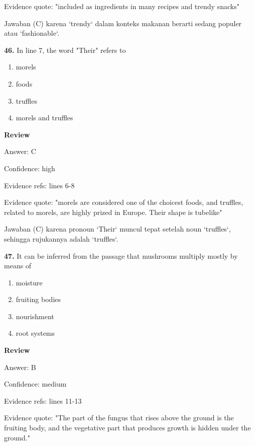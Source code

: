 \documentclass[12pt]{article}
\begin{document}
Evidence quote: "included as ingredients in many recipes and trendy snacks"\par
Jawaban (C) karena `trendy` dalam konteks makanan berarti sedang populer atau `fashionable`.\par
\endgroup
\par
\vspace{0.25\baselineskip}
\noindent\textbf{46.} In line 7, the word "Their" refers to
\begin{enumerate}[label=(\Alph*),leftmargin=*,itemsep=0.2em]
\item morels
\item foods
\item truffles
\item morels and truffles
\end{enumerate}
\par
\begingroup
\setlength{\parskip}{0pt}
\setlength{\parindent}{0pt}
\textbf{Review}\par
Answer: C\par
Confidence: high\par
Evidence refs: lines 6-8\par
Evidence quote: "morels are considered one of the choicest foods, and truffles, related to morels, are highly prized in Europe. Their shape is tubelike"\par
Jawaban (C) karena pronoun `Their` muncul tepat setelah noun `truffles`, sehingga rujukannya adalah `truffles`.\par
\endgroup
\par
\vspace{0.25\baselineskip}
\noindent\textbf{47.} It can be inferred from the passage that mushrooms multiply mostly by means of
\begin{enumerate}[label=(\Alph*),leftmargin=*,itemsep=0.2em]
\item moisture
\item fruiting bodies
\item nourishment
\item root systems
\end{enumerate}
\par
\begingroup
\setlength{\parskip}{0pt}
\setlength{\parindent}{0pt}
\textbf{Review}\par
Answer: B\par
Confidence: medium\par
Evidence refs: lines 11-13\par
Evidence quote: "The part of the fungus that rises above the ground is the fruiting body, and the vegetative part that produces growth is hidden under the ground."\par
\end{document}
